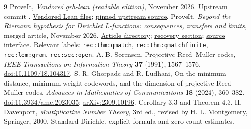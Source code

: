 \documentclass[11pt]{article}
\theoremstyle{remark}\newtheorem{remark}[theorem]{Remark}
\begin{document}
\begin{thebibliography}{9}
 ProveIt, \emph{Vendored grh-lean (readable edition)}, November 2026. Upstream commit . \href{https://github.com/VladimirReshetnikov/ProveIt/tree/main/Analysis/GeneralizedRiemannHypothesis/vendor/grh-lean}{Vendored Lean files}; \href{https://github.com/lsernau/grh-lean/tree/72fead102f663d5c7a407964a13dc0cf9d977207/grh}{pinned upstream source}.
 ProveIt, \emph{Beyond the Riemann hypothesis for Dirichlet L-functions: consequences, transfers and limits}, merged article, November 2026. \href{https://github.com/VladimirReshetnikov/ProveIt/tree/main/Analysis/GeneralizedRiemannHypothesis/Article}{Article directory}; \href{https://github.com/VladimirReshetnikov/ProveIt/blob/main/Analysis/GeneralizedRiemannHypothesis/Article/sections/rec.tex}{recovery section}; \href{https://github.com/VladimirReshetnikov/ProveIt/blob/main/Analysis/GeneralizedRiemannHypothesis/Article/sections/src.tex}{source interface}. Relevant labels: \texttt{rec:thm:qmatch}, \texttt{rec:thm:qmatchfinite}, \texttt{rec:lem:gram}, \texttt{rec:sec:open}.
 A. B. S\o rensen, Projective Reed--Muller codes, \emph{IEEE Transactions on Information Theory} \textbf{37} (1991), 1567--1576. \href{https://doi.org/10.1109/18.104317}{doi:10.1109/18.104317}.
 S. R. Ghorpade and R. Ludhani, On the minimum distance, minimum weight codewords, and the dimension of projective Reed--Muller codes, \emph{Advances in Mathematics of Communications} \textbf{18} (2024), 360--382. \href{https://doi.org/10.3934/amc.2023035}{doi:10.3934/amc.2023035}; \href{https://arxiv.org/abs/2309.10196}{arXiv:2309.10196}. Corollary 3.3 and Theorem 4.3.
 H. Davenport, \emph{Multiplicative Number Theory}, 3rd ed., revised by H. L. Montgomery, Springer, 2000. Standard Dirichlet explicit formula and zero-count estimates.
\end{thebibliography}
\end{document}
